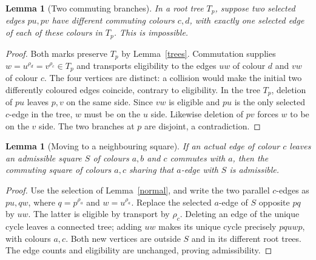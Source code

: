 \documentclass[11pt,a4paper]{article}
\newtheorem{lemma}[theorem]{Lemma}
\begin{document}
\begin{lemma}[Two commuting branches]\label{branches}
In a root tree $T_p$, suppose two selected edges $pu,pv$ have
different commuting colours $c,d$, with exactly one selected edge
of each of these colours in $T_p$. This is impossible.
\end{lemma}
\begin{proof}
Both marks preserve $T_p$ by Lemma~\ref{trees}. Commutation
supplies $w=u^{\rho_d}=v^{\rho_c}\in T_p$ and transports
eligibility to the edges $uw$ of colour $d$ and $vw$ of colour
$c$. The four vertices are distinct: a collision would make the
initial two differently coloured edges coincide, contrary to
eligibility. In the tree $T_p$, deletion of $pu$ leaves $p,v$
on the same side. Since $vw$ is eligible and $pu$ is the only
selected $c$-edge in the tree, $w$ must be on the $u$ side.
Likewise deletion of $pv$ forces $w$ to be on the $v$ side.
The two branches at $p$ are disjoint, a contradiction.
\end{proof}

\begin{lemma}[Moving to a neighbouring square]\label{move}
If an actual edge of colour $c$ leaves an admissible square $S$
of colours $a,b$ and $c$ commutes with $a$, then the commuting
square of colours $a,c$ sharing that $a$-edge with $S$ is
admissible.
\end{lemma}
\begin{proof}
Use the selection of Lemma~\ref{normal}, and write the two
parallel $c$-edges as $pu,qw$, where $q=p^{\rho_a}$ and
$w=u^{\rho_a}$. Replace the selected $a$-edge of $S$ opposite
$pq$ by $uw$. The latter is eligible by transport by $\rho_c$.
Deleting an edge of the unique cycle leaves a connected tree;
adding $uw$ makes its unique cycle precisely $pquwp$, with
colours $a,c$. Both new vertices are outside $S$ and in its
different root trees. The edge counts and eligibility are
unchanged, proving admissibility.
\end{proof}
\end{document}
